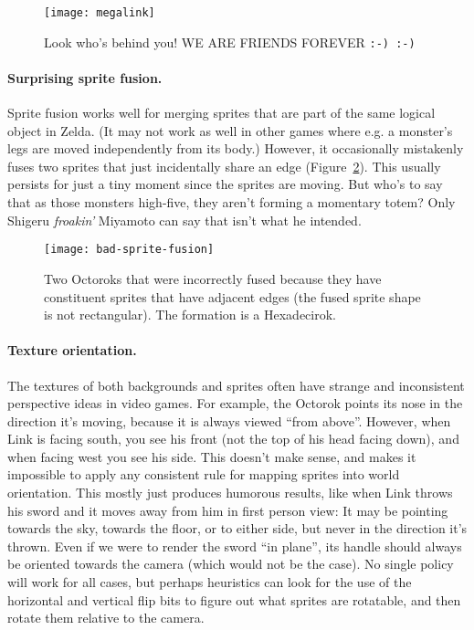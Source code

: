 \documentclass[twocolumn]{article}
\begin{document}
\begin{figure}[ht]
\begin{center}
\texttt{[image: megalink]}
\end{center}\vspace{-0.1in}
\caption{Look who's behind you! WE ARE FRIENDS FOREVER {\tt:-) :-)}
} \label{fig:megalink}
\end{figure}

\paragraph{Surprising sprite fusion.}
Sprite fusion works well for merging sprites that are part of the same
logical object in Zelda. (It may not work as well in other games where
e.g. a monster's legs are moved independently from its body.) However,
it occasionally mistakenly fuses two sprites that just incidentally
share an edge (Figure~\ref{fig:badfusion}). This usually persists for
just a tiny moment since the sprites are moving. But who's to say that
as those monsters high-five, they aren't forming a momentary totem?
Only Shigeru {\it froakin'} Miyamoto can say that isn't what he intended.

\begin{figure}[ht]
\begin{center}
\texttt{[image: bad-sprite-fusion]}
\end{center}\vspace{-0.1in}
\caption{Two Octoroks that were incorrectly fused because they have
constituent sprites that have adjacent edges (the fused sprite shape is
not rectangular). The formation is a Hexadecirok.
} \label{fig:badfusion}
\end{figure}

\paragraph{Texture orientation.} The textures of both backgrounds and sprites
often have strange and inconsistent perspective ideas in video games.
For example, the Octorok points its nose in the direction it's moving,
because it is always viewed ``from above''. However, when Link is
facing south, you see his front (not the top of his head facing down),
and when facing west you see his side. This doesn't make sense, and
makes it impossible to apply any consistent rule for mapping sprites
into world orientation. This mostly just produces humorous results,
like when Link throws his sword and it moves away from him in first
person view: It may be pointing towards the sky, towards the floor, or
to either side, but never in the direction it's thrown. Even if we
were to render the sword ``in plane'', its handle should always be
oriented towards the camera (which would not be the case). No single
policy will work for all cases, but perhaps heuristics can look for
the use of the horizontal and vertical flip bits to figure out what
sprites are rotatable, and then rotate them relative to the camera.
\end{document}
